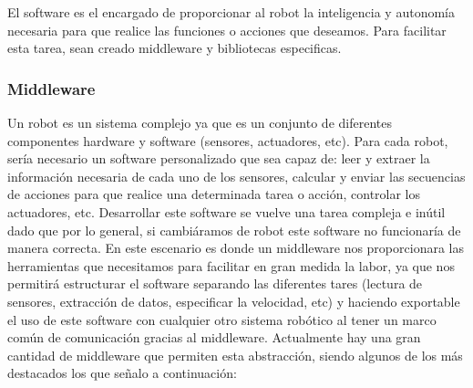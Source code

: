 El software es el encargado de proporcionar al robot la inteligencia y autonomía necesaria para que realice las funciones o acciones que deseamos. Para facilitar esta tarea, sean creado middleware y bibliotecas especificas.

\subsubsection{Middleware}

Un robot es un sistema complejo ya que es un conjunto de diferentes componentes hardware y software (sensores, actuadores, etc). Para cada robot, sería necesario un software personalizado que sea capaz de: leer y extraer la información necesaria de cada uno de los sensores, calcular y enviar las secuencias de acciones para que realice una determinada tarea o acción, controlar los actuadores, etc. Desarrollar este software se vuelve una tarea compleja e inútil dado que por lo general, si cambiáramos de robot este software no funcionaría de manera correcta.
En este escenario es donde un middleware nos proporcionara las herramientas que necesitamos para facilitar en gran medida la labor, ya que nos permitirá estructurar el software separando las diferentes tares (lectura de sensores, extracción de datos, especificar la velocidad, etc) y haciendo exportable el uso de este software con cualquier otro sistema robótico al tener un marco común de comunicación gracias al middleware.
Actualmente hay una gran cantidad de middleware que permiten esta abstracción, siendo algunos de los más destacados los que señalo a continuación:
